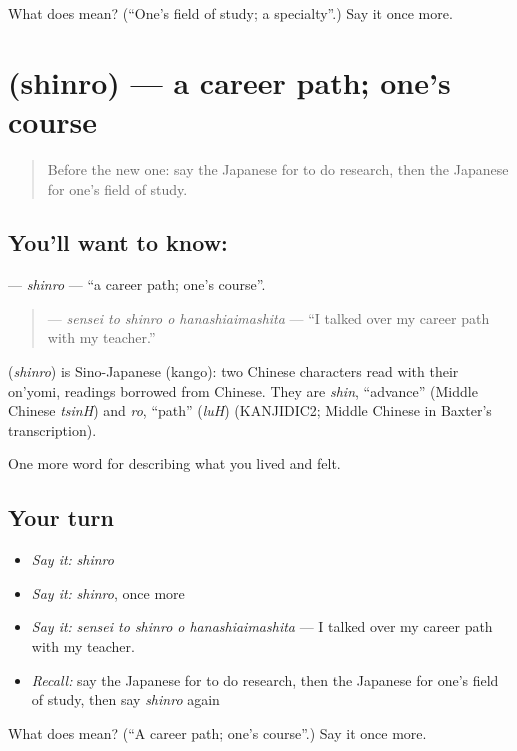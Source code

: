 \begin{tcolorbox}[breakable,colback=teal!4,colframe=teal!35!black,title={Before you move on}]
What does  mean? (\textquotedblleft{}One's field of study; a specialty\textquotedblright{}.) Say it once more.
\end{tcolorbox}
\section[\texorpdfstring{\ja{しんろ} (shinro)}{しんろ (shinro)}]{ (shinro) — a career path; one's course}

\label{lesson:JA-C459-shinro}



\begin{quote}
Before the new one: say the Japanese for to do research, then the Japanese for one's field of study.
\end{quote}

\subsection*{You'll want to know: }
\textbf{} — \emph{shinro} — \textquotedblleft{}a career path; one's course\textquotedblright{}.

\begin{quote}
\textbf{  } — \emph{sensei to shinro o hanashiaimashita} — \textquotedblleft{}I talked over my career path with my teacher.\textquotedblright{}
\end{quote}

\begin{cousinweb}
\textbf{} (\emph{shinro}) is Sino-Japanese (kango): two Chinese characters read with their on'yomi, readings borrowed from Chinese. They are \emph{shin}, \textquotedblleft{}advance\textquotedblright{} (Middle Chinese \emph{tsinH}) and \emph{ro}, \textquotedblleft{}path\textquotedblright{} (\emph{luH}) (KANJIDIC2; Middle Chinese in Baxter's transcription).
\end{cousinweb}

\begin{grammarlens}[title={What you've built}]
One more word for describing what you lived and felt.
\end{grammarlens}

\subsection*{Your turn}
\begin{itemize}
\raggedright
  \item \emph{Say it:} \emph{shinro}
  \item \emph{Say it:} \emph{shinro}, once more
  \item \emph{Say it:} \emph{sensei to shinro o hanashiaimashita} — I talked over my career path with my teacher.
  \item \emph{Recall:} say the Japanese for to do research, then the Japanese for one's field of study, then say \emph{shinro} again
\end{itemize}

\begin{tcolorbox}[breakable,colback=teal!4,colframe=teal!35!black,title={Before you move on}]
What does  mean? (\textquotedblleft{}A career path; one's course\textquotedblright{}.) Say it once more.
\end{tcolorbox}

